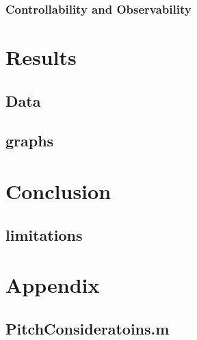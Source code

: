 \documentclass{article}
\begin{document}
\subsubsection{Controllability and Observability}

\section{Results}

\subsection{Data}
\subsection{graphs}

\section{Conclusion}
\subsection{limitations}
\section{Appendix}
\subsection{PitchConsideratoins.m}
\end{document}
